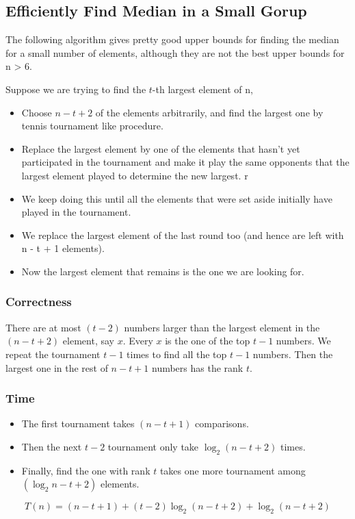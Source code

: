 \subsection{Efficiently Find Median in a Small Gorup}
The following algorithm gives pretty good upper bounds for finding the median for a small number of elements, although they are not the best upper bounds
for n > 6.

Suppose we are trying to find the $t$-th largest element of n,
\begin{itemize}
	
	\item Choose $n - t + 2$ of the elements arbitrarily, and find the largest one by tennis tournament like procedure. 
	
	\item Replace the largest element by one of the elements that hasn't yet participated in the tournament and make it play the same opponents that the largest element played to determine the new largest. r
	
	\item We keep doing this until all the elements that were set aside initially have played in the tournament. 
	
	\item We replace the largest element of the last round too (and hence are left with n - t + 1 elements).
	
	\item Now the largest element that remains is the one we are looking for.
\end{itemize}

\subsubsection{Correctness}
There are at most $(t-2)$ numbers larger than the largest element in the $(n - t + 2)$ element, say $x$. Every $x$ is the one of the top $t-1$ numbers. We repeat the tournament $t-1$ times to find all the top $t-1$ numbers. Then the largest one in the rest of $n - t + 1$ numbers has the rank $t$.

\subsubsection{Time}
\begin{itemize}
	\item The first tournament takes $(n - t + 1)$ comparisons. 
	\item Then the next $t - 2$ tournament only take $\log_2 (n - t + 2)$ times. \item Finally, find the one with rank $t$ takes one more tournament among $(\log_2 n - t + 2)$ elements.
\end{itemize}

\[T(n) = (n - t + 1) + (t -2 )\log_2 (n - t + 2) + \log_2 (n - t + 2)\]


